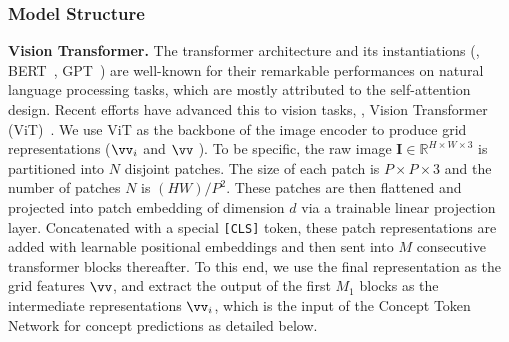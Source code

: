  
\subsubsection{Model Structure}
\noindent \textbf{Vision Transformer.}
\label{sec:vit}   %
The transformer architecture and its instantiations (\eg, BERT~\citep{devlin2018bert}, GPT~\citep{brown2020language}) are well-known for their remarkable performances on natural language processing tasks, which are mostly attributed to the self-attention design. Recent efforts have advanced this to vision tasks, \ie, Vision Transformer (ViT)~\citep{dosovitskiy2020image}. 
We use ViT as the backbone of the image encoder to produce grid representations ($\vv_i$ and $\vv$ ). 
To be specific, the raw image $\mathbf{I}\in\mathbb{R}^{H\times W \times3}$ is partitioned into $N$ disjoint patches. The size of each patch is $P\!\times\!P\!\times\!3$ and the number of patches $N\!$ is 
${(H W)}/{P^2}$. 
These patches are then flattened and projected into patch embedding of dimension $d$ via a trainable linear projection layer. Concatenated with a special \texttt{[CLS]} token, these patch representations are added with learnable positional embeddings and then sent into $M$ consecutive transformer blocks thereafter. 
To this end, we use the final representation as the grid features $\vv$, and extract the output of the first $M_1$ blocks as the intermediate representations $\vv_i$, which is the input of the Concept Token Network for concept predictions as detailed below. 

